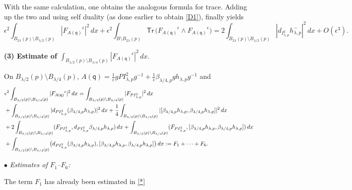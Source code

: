 \documentclass[11pt]{article}
\numberwithin{equation}{section} \setlength{\topmargin}{-35pt}
\newcommand{\q}{\mathsf{q}}
\newcommand{\tr}{\mathsf{Tr}}
\begin{document}
\noindent With the same calculation, one obtains the analogous
formula for trace. Adding up the two and using self duality (as done
earlier to obtain \eqref{D1}), finally yields
\begin{equation}
\label{D2} \epsilon^2\int_{B_{2\lambda}(p)\setminus
B_{\lambda/2}(p)}|{F_{A(\q)}}^{\epsilon}|^2\,dx+\epsilon^2\int
_{B\setminus B_{2\lambda}(p)}\tr\,\bigl({F_{A(\q)}}^{\epsilon}\wedge
{F_{A(\q)}}^{\epsilon})=2 \int_{B_{2\lambda}(p)\setminus
B_{\lambda/2}(p)} |d_{I^2_{\lambda,p}}h_{\lambda,p}^-|^2\,dx +
O(\epsilon^3).
\end{equation}

\medskip

\noindent\textbf{(3) Estimate of $\int_{B_{\lambda/2}(p)\setminus
B_{\lambda/4}(p)}|{F_{A(\q)}}^{\epsilon}|^2\,dx$}\;.

\noindent On $B_{\lambda/2}(p)\setminus B_{\lambda/4}(p)$,
$A(\q)=\frac{1}{\epsilon}gPI^2_{\lambda,p}g^{-1}+\frac{1}{\epsilon}
\beta_{\lambda/4,p}gh_{\lambda,p}g^{-1}$ and
\begin{align}
\label{YM3} & \epsilon^2\int_{B_{\lambda/2}(p)\setminus
B_{\lambda/4}(p)}|{F_{A(\q)}}^{\epsilon}|^2 \,dx
=\int_{B_{\lambda/2}(p)\setminus B_{\lambda/4}(p)}|F_{PI^2_{\lambda,p}}|^2 \,dx\notag\\
&+\int_{B_{\lambda/2}(p)\setminus
B_{\lambda/4}(p)}|d_{PI^2_{\lambda,p}}(\beta_{\lambda/4,p}
h_{\lambda,p}) |^2\,dx
+\frac{1}{4}\int_{B_{\lambda/2}(p)\setminus B_{\lambda/4}(p)}|[\beta_{\lambda/4,p}h_{\lambda,p}, \beta_{\lambda/4,p}h_{\lambda,p}]|^2\,dx\notag\\
&+2\int_{B_{\lambda/2}(p)\setminus B_{\lambda/4}(p)}(F_{
PI^2_{\lambda,p}},d_{ PI^2_{\lambda,p}}\beta_{\lambda/4,p}
h_{\lambda,p})\,dx+\int_{B_{\lambda/2}(p)\setminus
B_{\lambda/4}(p)}(F_{ PI^2_{\lambda,p}},[\beta_{\lambda/4,p}
h_{\lambda,p} ,\beta_{\lambda/4,p}
h_{\lambda,p}])\,dx\notag\\
& + \int_{B_{\lambda/2}(p)\setminus B_{\lambda/4}(p)}\bigl(d_{
PI^2_{\lambda,p}}(\beta_{\lambda/4,p}
h_{\lambda,p}),[\beta_{\lambda/4,p}h_{\lambda,p} ,
 \beta_{\lambda/4,p}h_{\lambda,p} ]\bigr)\,dx:= F_1 + \cdots +
 F_6.\notag\\
\end{align}
\medskip

 \noindent $\bullet$ \emph{Estimates of $F_1$--$F_6$:}

 \medskip

\noindent The term $F_1$ has already been estimated in \eqref{*}
\end{document}
